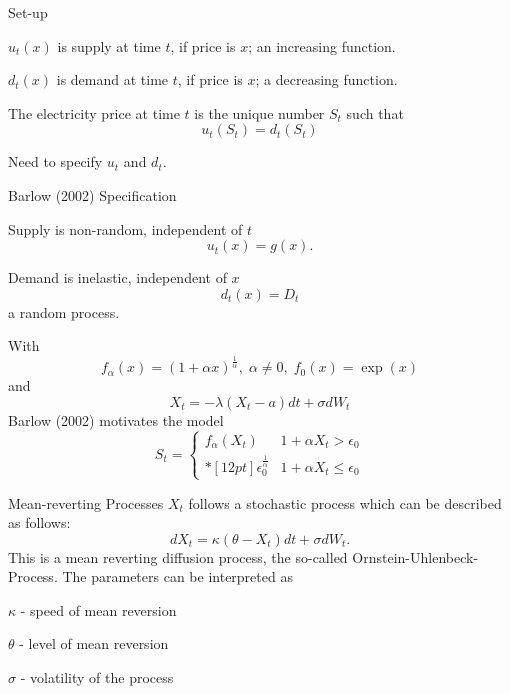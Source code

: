 {Set-up}
\item<1-> $u_t(x)$ is supply at time $t$, if price is $x$; an increasing function.
\item<2-> $d_t(x)$ is demand at time $t$, if price is $x$; a decreasing function.
\item<3-> The electricity price at time $t$ is the unique number $S_t$ such that
$$
u_t(S_t)=d_t(S_t)
$$
\item<4-> Need to specify $u_t$ and $d_t$.

{Barlow (2002) Specification}
\item<1-> Supply is non-random, independent of $t$
$$u_t(x)=g(x).$$
\item<2-> Demand is inelastic, independent of $x$
$$d_t(x)=D_t$$
a random process.
\item<3-> With
$$
f_\alpha(x) = (1+\alpha x)^\frac{1}{\alpha}, \;\alpha \not=0, \; f_0(x)=\exp(x)
$$
and
$$
X_t= -\lambda (X_t-a)dt +\sigma dW_t
$$
Barlow (2002) motivates the model
$$
S_t= \left \{ \begin{array}{ll}
\displaystyle
f_\alpha(X_t) & 1+\alpha  X_t> \epsilon_0 \\*[12pt]
\epsilon_0^\frac{1}{\alpha} & 1+\alpha X_t \leq \epsilon_0
\end{array}
\right.
$$


{Mean-reverting Processes}
$X_t$ follows a stochastic process which can be described as follows:
$$
dX_t= \kappa \left( \theta -X_t \right) dt + \sigma dW_t.
$$
This is  a mean reverting diffusion process, the so-called Ornstein-Uhlenbeck-Process.
The parameters can be interpreted as
\item $\kappa$ - speed of mean reversion
\item $\theta$ - level of mean reversion
\item $\sigma$ - volatility of the process

